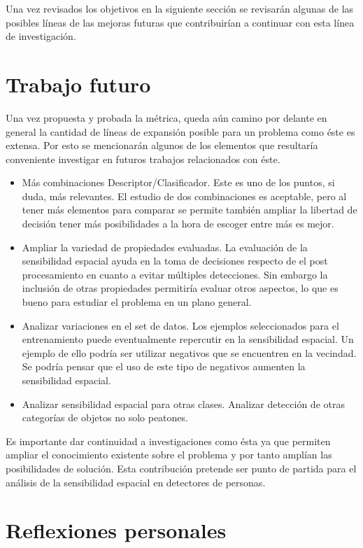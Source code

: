Una vez revisados los objetivos en la siguiente sección se revisarán algunas de las posibles líneas de las mejoras futuras que contribuirían a continuar con esta línea de investigación.


\section{Trabajo futuro}

Una vez propuesta y probada la métrica, queda aún camino por delante en general la cantidad de líneas de expansión posible para un problema como éste es extensa. Por esto se mencionarán algunos de los elementos que resultaría conveniente investigar en futuros trabajos relacionados con éste. 

\begin{itemize}
\item Más combinaciones Descriptor/Clasificador. Este es uno de los puntos, si duda, más relevantes. El estudio de dos combinaciones es aceptable, pero al tener más elementos para comparar se permite también ampliar la libertad de decisión \ie tener más posibilidades a la hora de escoger entre más es mejor.
\item Ampliar la variedad de propiedades evaluadas. La evaluación de la sensibilidad espacial ayuda en la toma de decisiones respecto de el post procesamiento en cuanto a evitar múltiples detecciones. Sin embargo la inclusión de otras propiedades permitiría evaluar otros aspectos, lo que es bueno para estudiar el problema en un plano general.
\item Analizar variaciones en el set de datos. Los ejemplos seleccionados para el entrenamiento puede eventualmente repercutir en la sensibilidad espacial. Un ejemplo de ello podría ser utilizar negativos que se encuentren en la vecindad. Se podría pensar que el uso de este tipo de negativos aumenten la sensibilidad espacial.
\item Analizar sensibilidad espacial para otras clases. Analizar detección de otras categorías de objetos no solo peatones.
\end{itemize}

Es importante dar continuidad a investigaciones como ésta ya que permiten ampliar el conocimiento existente sobre el problema y por tanto amplían las posibilidades de solución. Esta contribución pretende ser punto de partida para el análisis de la sensibilidad espacial en detectores de personas.

\section{Reflexiones personales}

